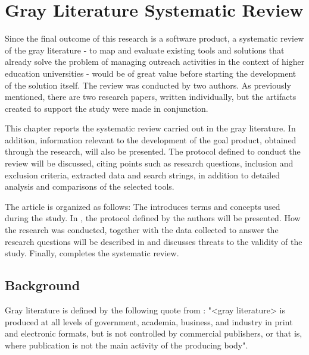 \chapter{Gray Literature Systematic Review}\label{grayliterature}

Since the final outcome of this research is a software product, a systematic review of the gray literature - to map and evaluate existing tools and solutions that already solve the problem of managing outreach activities in the context of higher education universities - would be of great value before starting the development of the solution itself. The review was conducted by two authors. As previously mentioned, there are two research papers, written individually, but the artifacts created to support the study were made in conjunction.

This chapter reports the systematic review carried out in the gray literature. In addition, information relevant to the development of the goal product, obtained through the research, will also be presented. The protocol defined to conduct the review will be discussed, citing points such as research questions, inclusion and exclusion criteria, extracted data and search strings, in addition to detailed analysis and comparisons of the selected tools.

The article is organized as follows: The  introduces terms and concepts used during the study. In , the protocol defined by the authors will be presented. How the research was conducted, together with the data collected to answer the research questions will be described in  and  discusses threats to the validity of the study. Finally,  completes the systematic review.

\section{Background}\label{sec:gl-background}

Gray literature is defined by the following quote from \cite{garousi2019guidelines}: "<gray literature> is produced at all levels of government, academia, business, and industry in print and electronic formats, but is not controlled by commercial publishers, or that is, where publication is not the main activity of the producing body".

